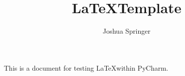 \documentclass[11pt]{article}
\author{Joshua Springer}
\title{\LaTeX Template}
\begin{document}
    \maketitle

    This is a document for testing \LaTeX within PyCharm.\cite{small}


    
    
\end{document}
